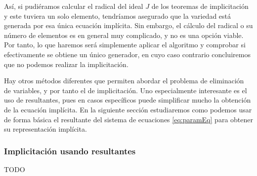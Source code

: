 Así, si pudiéramos calcular el radical del ideal $J$ de los teoremas de implicitación y este tuviera un solo elemento, tendríamos asegurado que la variedad está generada por esa única ecuación implícita. Sin embargo, el cálculo del radical o su número de elementos es en general muy complicado, y no es una opción viable. Por tanto, lo que haremos será simplemente aplicar el algoritmo y comprobar si efectivamente se obtiene un único generador, en cuyo caso contrario concluiremos que no podemos realizar la implicitación.\newline

Hay otros métodos diferentes que permiten abordar el problema de eliminación de variables, y por tanto el de implicitación. Uno especialmente interesante es el uso de resultantes, pues en casos específicos puede simplificar mucho la obtención de la ecuación implícita. En la siguiente sección estudiaremos como podemos usar de forma básica el resultante del sistema de ecuaciones \eqref{eq:paramEq} para obtener su representación implícita.

\subsubsection{Implicitación usando resultantes }
TODO
